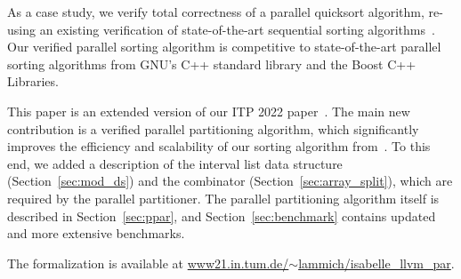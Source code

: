 \documentclass[sn-mathphys,Numbered]{sn-jnl}
\theoremstyle{thmstyleone}%
\theoremstyle{definition}%
\theoremstyle{thmstylethree}%
\begin{document}
As a case study, we verify total correctness of a parallel quicksort algorithm,
re-using an existing verification of state-of-the-art sequential sorting algorithms~\cite{La20}.
Our verified parallel sorting algorithm is competitive to state-of-the-art parallel sorting algorithms
from GNU's C++ standard library and the Boost C++ Libraries.

This paper is an extended version of our ITP 2022 paper~\cite{La22}.
The main new contribution is a verified parallel partitioning algorithm,
which significantly improves the efficiency and scalability of our sorting algorithm from~\cite{La22}.
To this end, we added a description of the interval list data structure (Section~\ref{sec:mod_ds})
and the  combinator (Section~\ref{sec:array_split}), which are required by the parallel partitioner.
The parallel partitioning algorithm itself is described in Section~\ref{sec:ppar}, and Section~\ref{sec:benchmark}
contains updated and more extensive benchmarks.




%
%

The formalization is available at \href{https://www21.in.tum.de/~lammich/isabelle_llvm_par/}{www21.in.tum.de/$\sim$lammich/isabelle\_llvm\_par}.
\end{document}
